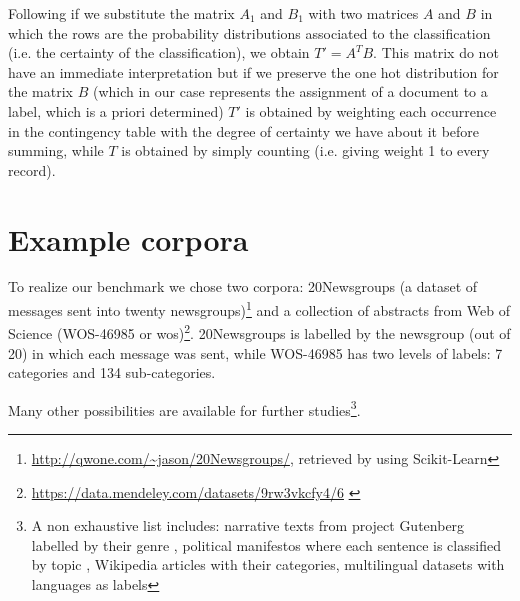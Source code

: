 \documentclass[11pt, a4paper, oneside, openright]{book}
\begin{document}
Following \textcite{lei2014} if we substitute the matrix $A_1$ and $B_1$ with two matrices $A$ and $B$ in which the rows are the probability distributions associated to the classification (i.e. the certainty of the classification), we obtain $T' = A^T B$.
This matrix do not have an immediate interpretation but if we preserve the one hot distribution for the matrix $B$ (which in our case represents the assignment of a document to a label, which is a priori determined) $T'$ is obtained by weighting each occurrence in the contingency table with the degree of certainty we have about it before summing, while $T$ is obtained by simply counting (i.e. giving weight 1 to every record).
 
\section{Example corpora}
To realize our benchmark we chose two corpora: 20Newsgroups (a dataset of messages sent into twenty newsgroups)\footnote{\url{http://qwone.com/~jason/20Newsgroups/}, retrieved by using Scikit-Learn} and a collection of abstracts from Web of Science (WOS-46985 or wos)\footnote{\url{https://data.mendeley.com/datasets/9rw3vkcfy4/6} \parencite{kowsari2017}}. 20Newsgroups is labelled by the newsgroup (out of 20) in which each message was sent, while WOS-46985 has two levels of labels: 7 categories and 134 sub-categories.

Many other possibilities are available for further studies\footnote{A non exhaustive list includes: narrative texts from project Gutenberg labelled by their genre \parencite{gerlachStandardizedProjectGutenberg2018}, political manifestos where each sentence is classified by topic \parencite{merzManifestoCorpusNew2016}, Wikipedia articles with their categories, multilingual datasets with languages as labels}.


\clearpage
\begin{refcontext}[sorting=nyt]
	\printbibliography{}
\end{refcontext}
\end{document}
